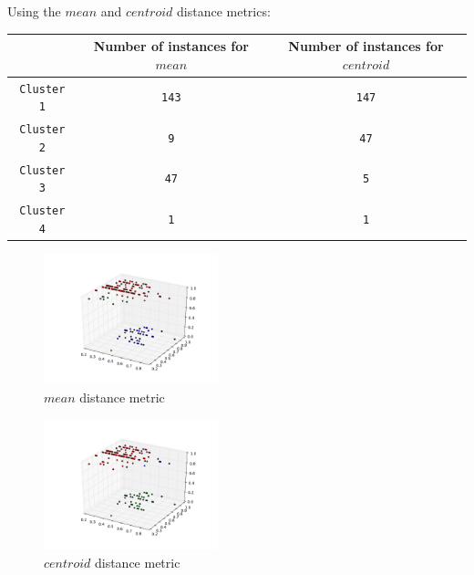 \documentclass{article}
\begin{document}
\begin{enumerate}[a.]
\begin{enumerate}[(a)]
Using the $mean$ and $centroid$ distance metrics:\\

\begin{center}
       \begin{tabular}{|c|c|c|} \hline
           & Number of instances for $mean$ & Number of instances for $centroid$\\ \hline
            \verb|Cluster 1| & \verb|143| & \verb|147|\\ \hline
            \verb|Cluster 2| & \verb|9| & \verb|47|\\ \hline
            \verb|Cluster 3| & \verb|47| & \verb|5|\\ \hline
            \verb|Cluster 4| & \verb|1| & \verb|1|\\ \hline
        \end{tabular}

\end{center}
\begin{figure}[htb]
\begin{center}
\includegraphics[width=0.45\textwidth]{3dplot_4_200_mean.pdf}
\caption{$mean$ distance metric}
\end{center}
\end{figure}

\begin{figure}[htb]
\begin{center}
\includegraphics[width=0.45\textwidth]{3dplot_4_200_cent.pdf}
\caption{$centroid$ distance metric}
\end{center}
\end{figure}


\end{enumerate}
\end{enumerate}
\end{document}
